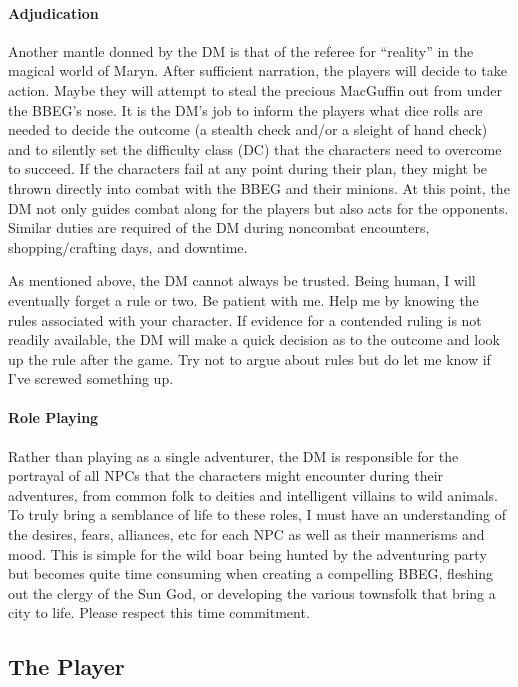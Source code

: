 \documentclass[12pt]{article}
\begin{document}
\paragraph{\textsf{Adjudication}}
\textsf{Another mantle donned by the DM is that of the referee for ``reality'' in the magical world of Maryn. After sufficient narration, the players will decide to take action. Maybe they will attempt to steal the precious MacGuffin out from under the BBEG's nose. It is the DM's job to inform the players what dice rolls are needed to decide the outcome (a stealth check and/or a sleight of hand check) and to silently set the difficulty class (DC) that the characters need to overcome to succeed. If the characters fail at any point during their plan, they might be thrown directly into combat with the BBEG and their minions. At this point, the DM not only guides combat along for the players but also acts for the opponents. Similar duties are required of the DM during noncombat encounters, shopping/crafting days, and downtime.} 

\textsf{As mentioned above, the DM cannot always be trusted. Being human, I will eventually forget a rule or two. Be patient with me. Help me by knowing the rules associated with your character. If evidence for a contended ruling is not readily available, the DM will make a quick decision as to the outcome and look up the rule after the game. Try not to argue about rules but do let me know if I've screwed something up.}

\paragraph{\textsf{Role Playing}}
\textsf{Rather than playing as a single adventurer, the DM is responsible for the portrayal of all NPCs that the characters might encounter during their adventures, from common folk to deities and intelligent villains to wild animals. To truly bring a semblance of life to these roles, I must have an understanding of the desires, fears, alliances, etc for each NPC as well as their mannerisms and mood. This is simple for the wild boar being hunted by the adventuring party but becomes quite time consuming when creating a compelling BBEG, fleshing out the clergy of the Sun God, or developing the various townsfolk that bring a city to life. Please respect this time commitment.} 

\subsection*{The Player}
\end{document}
